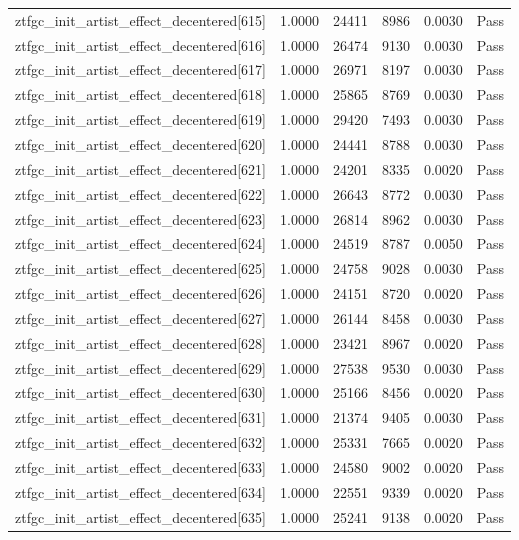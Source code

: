 \begin{table}[htbp]
\begin{tabular}{llrrll}
ztfgc\_init\_artist\_effect\_decentered[615] & 1.0000 & 24411 & 8986 & 0.0030 & Pass \\
ztfgc\_init\_artist\_effect\_decentered[616] & 1.0000 & 26474 & 9130 & 0.0030 & Pass \\
ztfgc\_init\_artist\_effect\_decentered[617] & 1.0000 & 26971 & 8197 & 0.0030 & Pass \\
ztfgc\_init\_artist\_effect\_decentered[618] & 1.0000 & 25865 & 8769 & 0.0030 & Pass \\
ztfgc\_init\_artist\_effect\_decentered[619] & 1.0000 & 29420 & 7493 & 0.0030 & Pass \\
ztfgc\_init\_artist\_effect\_decentered[620] & 1.0000 & 24441 & 8788 & 0.0030 & Pass \\
ztfgc\_init\_artist\_effect\_decentered[621] & 1.0000 & 24201 & 8335 & 0.0020 & Pass \\
ztfgc\_init\_artist\_effect\_decentered[622] & 1.0000 & 26643 & 8772 & 0.0030 & Pass \\
ztfgc\_init\_artist\_effect\_decentered[623] & 1.0000 & 26814 & 8962 & 0.0030 & Pass \\
ztfgc\_init\_artist\_effect\_decentered[624] & 1.0000 & 24519 & 8787 & 0.0050 & Pass \\
ztfgc\_init\_artist\_effect\_decentered[625] & 1.0000 & 24758 & 9028 & 0.0030 & Pass \\
ztfgc\_init\_artist\_effect\_decentered[626] & 1.0000 & 24151 & 8720 & 0.0020 & Pass \\
ztfgc\_init\_artist\_effect\_decentered[627] & 1.0000 & 26144 & 8458 & 0.0030 & Pass \\
ztfgc\_init\_artist\_effect\_decentered[628] & 1.0000 & 23421 & 8967 & 0.0020 & Pass \\
ztfgc\_init\_artist\_effect\_decentered[629] & 1.0000 & 27538 & 9530 & 0.0030 & Pass \\
ztfgc\_init\_artist\_effect\_decentered[630] & 1.0000 & 25166 & 8456 & 0.0020 & Pass \\
ztfgc\_init\_artist\_effect\_decentered[631] & 1.0000 & 21374 & 9405 & 0.0030 & Pass \\
ztfgc\_init\_artist\_effect\_decentered[632] & 1.0000 & 25331 & 7665 & 0.0020 & Pass \\
ztfgc\_init\_artist\_effect\_decentered[633] & 1.0000 & 24580 & 9002 & 0.0020 & Pass \\
ztfgc\_init\_artist\_effect\_decentered[634] & 1.0000 & 22551 & 9339 & 0.0020 & Pass \\
ztfgc\_init\_artist\_effect\_decentered[635] & 1.0000 & 25241 & 9138 & 0.0020 & Pass \\

\end{tabular}
\end{table}
